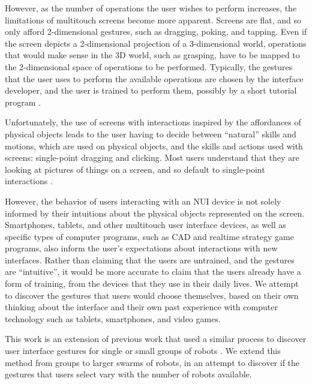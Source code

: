 However, as the number of operations the user wishes to perform increases, the limitations of multitouch screens become more apparent. 
Screens are flat, and so only afford 2-dimensional gestures, such as dragging, poking, and tapping. 
Even if the screen depicts a 2-dimensional projection of a 3-dimensional world, operations that would make sense in the 3D world, such as grasping, have to be mapped to the 2-dimensional space of operations to be performed. 
Typically, the gestures that the user uses to perform the available operations are chosen by the interface developer, and the user is trained to perform them, possibly by a short tutorial program \citep{wobbrock2009user, vanacken2008ghosts, freeman2009shadowguides}. 

Unfortunately, the use of screens with interactions inspired by the affordances of physical objects leads to the user having to decide between ``natural'' skills and motions, which are used on physical objects, and the skills and actions used with screens: single-point dragging and clicking. 
Most users understand that they are looking at pictures of things on a screen, and so default to single-point interactions \citep{vanacken2008ghosts}.

However, the behavior of users interacting with an NUI device is not solely informed by their intuitions about the physical objects represented on the screen. 
Smartphones, tablets, and other multitouch user interface devices, as well as specific types of computer programs, such as CAD and realtime strategy game programs, also inform the user's expectations about interactions with new interfaces. 
Rather than claiming that the users are untrained, and the gestures are ``intuitive'', it would be more accurate to claim that the users already have a form of training, from the devices that they use in their daily lives. 
We attempt to discover the gestures that users would choose themselves, based on their own thinking about the interface and their own past experience with computer technology such as tablets, smartphones, and video games. 

This work is an extension of previous work that used a similar process to discover user interface gestures for single or small groups of robots \citep{Micire:2009:ANG:1731903.1731912}. We extend this method from groups to larger swarms of robots, in an attempt to discover if the gestures that users select vary with the number of robots available.

